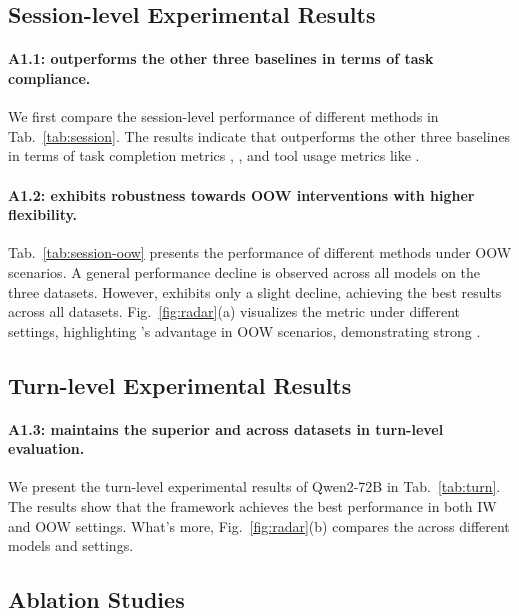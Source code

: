 \subsection{Session-level Experimental Results} \label{subsec:session_level_results}

\paragraph{A1.1: \model outperforms the other three baselines in terms of task compliance.}
We first compare the session-level performance of different methods in Tab.~\ref{tab:session}.
The results indicate that \model outperforms the other three baselines in terms of task completion metrics , , and tool usage metrics like .

\paragraph{A1.2: \model exhibits robustness towards OOW interventions with higher flexibility.}
Tab.~\ref{tab:session-oow} presents the performance of different methods under OOW scenarios.
A general performance decline is observed across all models on the three datasets.
However, \model exhibits only a slight decline, achieving the best results across all datasets.
Fig.~\ref{fig:radar}(a) visualizes the  metric under different settings, highlighting \model's advantage in OOW scenarios, demonstrating strong \oflex.


\subsection{Turn-level Experimental Results} \label{subsec:turn_level_results}


\paragraph{A1.3: \model maintains the superior \ofollow and \oflex across datasets in turn-level evaluation.}
We present the turn-level experimental results of Qwen2-72B in Tab.~\ref{tab:turn}. 
The results show that the \model framework achieves the best performance in both IW and OOW settings. 
What's more, Fig.~\ref{fig:radar}(b) compares the  across different models and settings.





\subsection{Ablation Studies}

